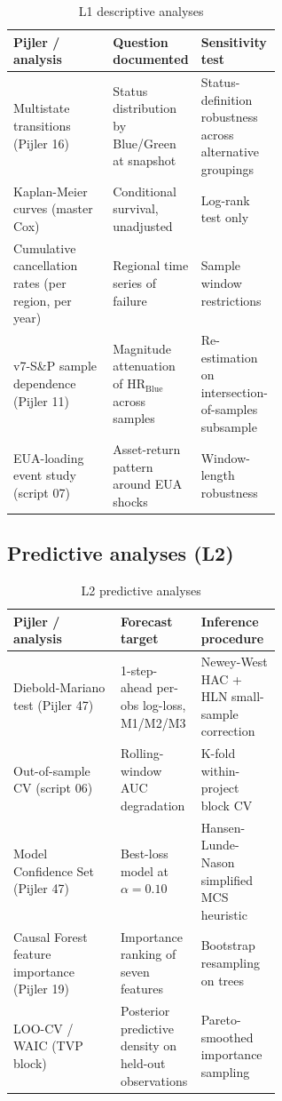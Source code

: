 \begin{table}[!htbp]
\centering
\caption{L1 descriptive analyses}
\label{tab:app-id-L1}
\small
\begin{tabular}{lp{0.30\linewidth}p{0.30\linewidth}}
\toprule
Pijler / analysis & Question documented & Sensitivity test \\
\midrule
Multistate transitions (Pijler 16) & Status distribution by Blue/Green at snapshot & Status-definition robustness across alternative groupings \\
Kaplan-Meier curves (master Cox) & Conditional survival, unadjusted & Log-rank test only \\
Cumulative cancellation rates (per region, per year) & Regional time series of failure & Sample window restrictions \\
v7-S\&P sample dependence (Pijler 11) & Magnitude attenuation of $\text{HR}_{\text{Blue}}$ across samples & Re-estimation on intersection-of-samples subsample \\
EUA-loading event study (script 07) & Asset-return pattern around EUA shocks & Window-length robustness \\
\bottomrule
\end{tabular}
\end{table}

\subsection*{Predictive analyses (L2)}

\begin{table}[!htbp]
\centering
\caption{L2 predictive analyses}
\label{tab:app-id-L2}
\small
\begin{tabular}{lp{0.30\linewidth}p{0.30\linewidth}}
\toprule
Pijler / analysis & Forecast target & Inference procedure \\
\midrule
Diebold-Mariano test (Pijler 47) & 1-step-ahead per-obs log-loss, M1/M2/M3 & Newey-West HAC + HLN small-sample correction \\
Out-of-sample CV (script 06) & Rolling-window AUC degradation & K-fold within-project block CV \\
Model Confidence Set (Pijler 47) & Best-loss model at $\alpha = 0.10$ & Hansen-Lunde-Nason simplified MCS heuristic \\
Causal Forest feature importance (Pijler 19) & Importance ranking of seven features & Bootstrap resampling on trees \\
LOO-CV / WAIC (TVP block) & Posterior predictive density on held-out observations & Pareto-smoothed importance sampling \\
\bottomrule
\end{tabular}
\end{table}

